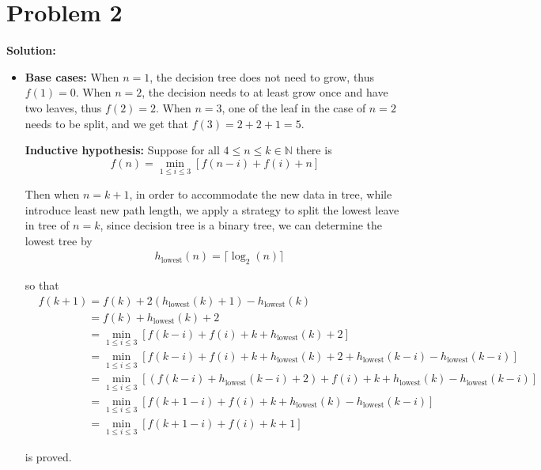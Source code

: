 \documentclass[11pt]{article}
\begin{document}
\section*{Problem 2}
\textbf{Solution:} 
	\begin{itemize}
		\item \textbf{Base cases:} When $n = 1$, the decision tree does not need to grow, thus $f(1) = 0$.
			  When $n = 2$, the decision needs to at least grow once and have two leaves, thus $f(2) = 2$.
			  When $n = 3$, one of the leaf in the case of $n = 2$ needs to be split, and we get that $f(3) = 2 + 2 + 1 = 5$.
			  
			  \textbf{Inductive hypothesis:} Suppose for all $4 \leq n \leq k \in \mathbb{N}$ there is 
			  \[f(n) = \min_{1\leq i\leq 3}[f(n - i) + f(i) + n]\]
			  
			  Then when $n =k + 1$, in order to accommodate the new data in tree, while introduce least new path length, we apply a strategy to split the lowest leave in tree of $n = k$, since decision tree is a binary tree, we can determine the lowest tree by
			  \begin{align}
			  	&h_{\text{lowest}}(n) = \lceil \log_2(n) \rceil\nonumber
			  \end{align}
			  
			  so that
			  \begin{align}
			  	&f(k + 1) = f(k) + 2(h_{\text{lowest}}(k) + 1) - h_{\text{lowest}}(k)\nonumber\\
			  	&\phantom{f(k + 1)} = f(k) + h_{\text{lowest}}(k) + 2\nonumber\\
			  	&\phantom{f(k + 1)} = \min_{1\leq i\leq 3} [f(k - i) + f(i) + k + h_{\text{lowest}}(k) + 2]\nonumber\\
			  	&\phantom{f(k + 1)} = \min_{1\leq i\leq 3} [f(k - i) + f(i) + k + h_{\text{lowest}}(k) + 2 + h_{\text{lowest}}(k - i) - h_{\text{lowest}}(k - i)]\nonumber\\
			  	&\phantom{f(k + 1)} = \min_{1\leq i\leq 3} [(f(k - i) + h_{\text{lowest}}(k - i) + 2) + f(i) + k + h_{\text{lowest}}(k) - h_{\text{lowest}}(k - i)]\nonumber\\
			  	&\phantom{f(k + 1)} = \min_{1\leq i\leq 3} [f(k + 1 - i) + f(i) + k + h_{\text{lowest}}(k) - h_{\text{lowest}}(k - i)]\nonumber\\
			  	&\phantom{f(k + 1)} = \min_{1\leq i\leq 3} [f(k + 1 - i) + f(i) + k + 1]\nonumber
			  \end{align}
			  
			  is proved.
			  

\end{itemize}
\end{document}
